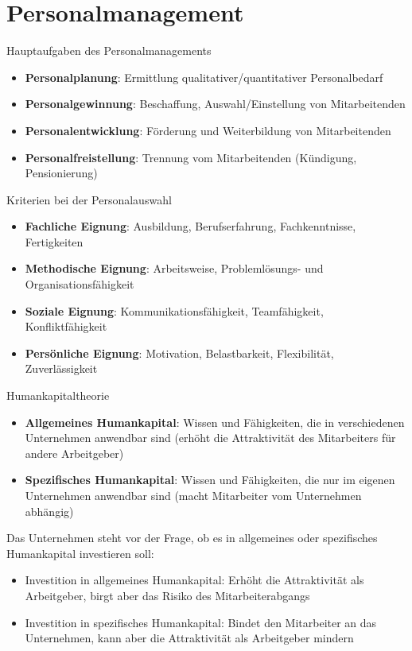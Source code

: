 \section{Personalmanagement}

\begin{concept}{Hauptaufgaben des Personalmanagements}
\begin{itemize}
    \item \textbf{Personalplanung}: Ermittlung qualitativer/quantitativer Personalbedarf
    \item \textbf{Personalgewinnung}: Beschaffung, Auswahl/Einstellung von Mitarbeitenden
    \item \textbf{Personalentwicklung}: Förderung und Weiterbildung von Mitarbeitenden
    \item \textbf{Personalfreistellung}: Trennung vom Mitarbeitenden (Kündigung, Pensionierung)
\end{itemize}
\end{concept}


\begin{definition}{Kriterien bei der Personalauswahl}
\begin{itemize}
    \item \textbf{Fachliche Eignung}: Ausbildung, Berufserfahrung, Fachkenntnisse, Fertigkeiten
    \item \textbf{Methodische Eignung}: Arbeitsweise, Problemlösungs- und Organisationsfähigkeit
    \item \textbf{Soziale Eignung}: Kommunikationsfähigkeit, Teamfähigkeit, Konfliktfähigkeit
    \item \textbf{Persönliche Eignung}: Motivation, Belastbarkeit, Flexibilität, Zuverlässigkeit
\end{itemize}
\end{definition}



\begin{concept}{Humankapitaltheorie}
\begin{itemize}
    \item \textbf{Allgemeines Humankapital}: Wissen und Fähigkeiten, die in verschiedenen Unternehmen anwendbar sind (erhöht die Attraktivität des Mitarbeiters für andere Arbeitgeber)
    \item \textbf{Spezifisches Humankapital}: Wissen und Fähigkeiten, die nur im eigenen Unternehmen anwendbar sind (macht Mitarbeiter vom Unternehmen abhängig)
\end{itemize}

Das Unternehmen steht vor der Frage, ob es in allgemeines oder spezifisches Humankapital investieren soll:
\begin{itemize}
    \item Investition in allgemeines Humankapital: Erhöht die Attraktivität als Arbeitgeber, birgt aber das Risiko des Mitarbeiterabgangs
    \item Investition in spezifisches Humankapital: Bindet den Mitarbeiter an das Unternehmen, kann aber die Attraktivität als Arbeitgeber mindern
\end{itemize}
\end{concept}

